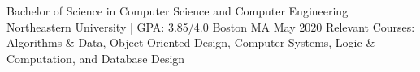 

\begin{cventries}

  \cventry
    {Bachelor of Science in Computer Science and Computer Engineering} %
    {Northeastern University | GPA: 3.85/4.0} %
    {Boston MA} %
    {May 2020} %
    {
      Relevant Courses: Algorithms \& Data, Object Oriented Design, Computer Systems, Logic \& Computation, and Database Design
    }

\end{cventries}
